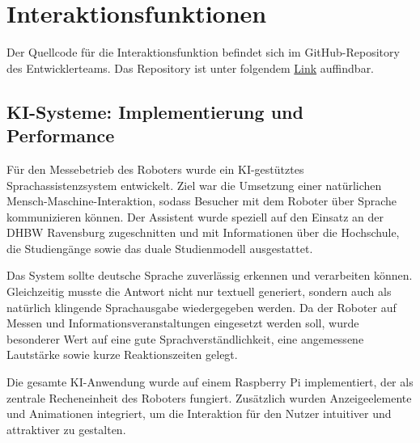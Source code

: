 \chapter{Interaktionsfunktionen}
\label{cha:Interaktionsfunktionen}

Der Quellcode für die Interaktionsfunktion befindet sich im GitHub-Repository des Entwicklerteams. Das Repository ist unter folgendem \textcolor{blue}{\href{https://github.com/faikhadutoglu/ExpoDroid}{Link}} auffindbar.

%
%

\section{KI-Systeme: Implementierung und Performance}
\label{sec:KI-Systeme}

Für den Messebetrieb des Roboters wurde ein KI-gestütztes Sprachassistenzsystem entwickelt. Ziel war die Umsetzung einer natürlichen Mensch-Maschine-Interaktion, sodass Besucher mit dem Roboter über Sprache kommunizieren können. Der Assistent wurde speziell auf den Einsatz an der DHBW Ravensburg zugeschnitten und mit Informationen über die Hochschule, die Studiengänge sowie das duale Studienmodell ausgestattet.


Das System sollte deutsche Sprache zuverlässig erkennen und verarbeiten können. Gleichzeitig musste die Antwort nicht nur textuell generiert, sondern auch als natürlich klingende Sprachausgabe wiedergegeben werden. Da der Roboter auf Messen und Informationsveranstaltungen eingesetzt werden soll, wurde besonderer Wert auf eine gute Sprachverständlichkeit, eine angemessene Lautstärke sowie kurze Reaktionszeiten gelegt.

Die gesamte KI-Anwendung wurde auf einem Raspberry Pi implementiert, der als zentrale Recheneinheit des Roboters fungiert. Zusätzlich wurden Anzeigeelemente und Animationen integriert, um die Interaktion für den Nutzer intuitiver und attraktiver zu gestalten.


